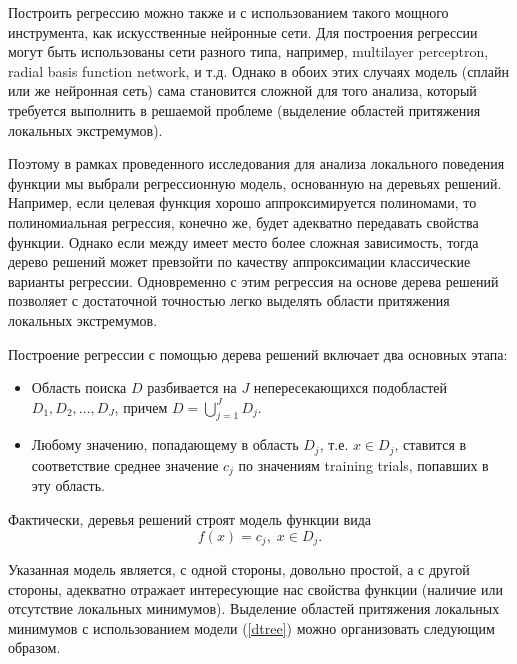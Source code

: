 \documentclass[entropy,article,submit,moreauthors,pdftex]{Definitions/mdpi}
\begin{document}
Построить регрессию можно также и с использованием такого мощного инструмента, как искусственные нейронные сети. 
Для построения регрессии могут быть использованы сети разного типа, например, multilayer perceptron, radial basis function network, и т.д. 
Однако в обоих этих случаях модель (сплайн или же нейронная сеть) сама становится сложной для того анализа, который требуется выполнить в решаемой проблеме (выделение областей притяжения локальных экстремумов). 

Поэтому в рамках проведенного исследования для анализа локального поведения функции мы выбрали регрессионную модель, основанную на деревьях решений. 
Например, если целевая функция хорошо аппроксимируется полиномами, то полиномиальная регрессия, конечно же, будет адекватно передавать свойства функции. Однако если между имеет место более сложная зависимость, тогда дерево решений может превзойти по качеству аппроксимации классические варианты регрессии.
Одновременно с этим регрессия на основе дерева решений позволяет с достаточной точностью легко выделять области притяжения локальных экстремумов.

Построение регрессии с помощью дерева решений включает два основных этапа:
\begin{itemize}
	\item Область поиска $D$ разбивается на $J$ непересекающихся подобластей $D_1, D_2, ..., D_J$, причем $D = \bigcup_{j=1}^{J}{D_j}$.
	\item Любому значению, попадающему в область $D_j$, т.е. $x \in D_j$, ставится в соответствие среднее значение $c_j$ по значениям training trials, попавших в эту область.
\end{itemize}

Фактически, деревья решений строят модель функции вида
\begin{equation}\label{dtree}
f(x) = c_j, \; x\in D_j.
\end{equation}
 
Указанная модель является, с одной стороны, довольно простой, а с другой стороны, адекватно отражает интересующие нас свойства функции (наличие или отсутствие локальных минимумов). Выделение областей притяжения локальных минимумов с использованием модели (\ref{dtree}) можно организовать следующим образом.
\end{document}
